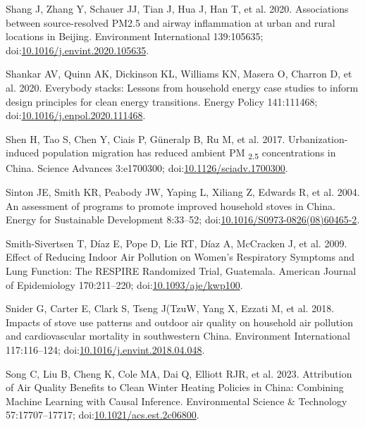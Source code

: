 \documentclass[
  letterpaper,
  DIV=11,
  numbers=noendperiod]{scrartcl}
\newlength{\cslhangindent}
\newenvironment{CSLReferences}[2] %
 {\begin{list}{}{%
  \setlength{\itemindent}{0pt}
  \setlength{\leftmargin}{0pt}
  \setlength{\parsep}{0pt}
  \ifodd #1
   \setlength{\leftmargin}{\cslhangindent}
   \setlength{\itemindent}{-1\cslhangindent}
  \fi
  \setlength{\itemsep}{#2\baselineskip}}}
 {\end{list}}
\providecommand{\DIFaddend}{} %
\DeclareRobustCommand{\DIFaddend}{\DIFOaddend \let\includegraphics\DIFOincludegraphics} %
\begin{document}
\begin{CSLReferences}{1}{1}
\DIFaddend {}
Shang J, Zhang Y, Schauer JJ, Tian J, Hua J, Han T, et al. 2020.
Associations between source-resolved {PM2}.5 and airway inflammation at
urban and rural locations in {Beijing}. Environment International
139:105635;
doi:\href{https://doi.org/10.1016/j.envint.2020.105635}{10.1016/j.envint.2020.105635}.

Shankar AV, Quinn AK, Dickinson KL, Williams KN, Masera O, Charron D, et
al. 2020. Everybody stacks: {Lessons} from household energy case studies
to inform design principles for clean energy transitions. Energy Policy
141:111468;
doi:\href{https://doi.org/10.1016/j.enpol.2020.111468}{10.1016/j.enpol.2020.111468}.

Shen H, Tao S, Chen Y, Ciais P, Güneralp B, Ru M, et al. 2017.
Urbanization-induced population migration has reduced ambient {PM}
{\textsubscript{2.5}} concentrations in {China}. Science Advances
3:e1700300;
doi:\href{https://doi.org/10.1126/sciadv.1700300}{10.1126/sciadv.1700300}.

Sinton JE, Smith KR, Peabody JW, Yaping L, Xiliang Z, Edwards R, et al.
2004. An assessment of programs to promote improved household stoves in
{China}. Energy for Sustainable Development 8:33--52;
doi:\href{https://doi.org/10.1016/S0973-0826(08)60465-2}{10.1016/S0973-0826(08)60465-2}.

Smith-Sivertsen T, Díaz E, Pope D, Lie RT, Díaz A, McCracken J, et al.
2009. Effect of {Reducing Indoor Air Pollution} on {Women}'s
{Respiratory Symptoms} and {Lung Function}: {The RESPIRE Randomized
Trial}, {Guatemala}. American Journal of Epidemiology 170:211--220;
doi:\href{https://doi.org/10.1093/aje/kwp100}{10.1093/aje/kwp100}.

Snider G, Carter E, Clark S, Tseng J(TzuW, Yang X, Ezzati M, et al.
2018. Impacts of stove use patterns and outdoor air quality on household
air pollution and cardiovascular mortality in southwestern {China}.
Environment International 117:116--124;
doi:\href{https://doi.org/10.1016/j.envint.2018.04.048}{10.1016/j.envint.2018.04.048}.

Song C, Liu B, Cheng K, Cole MA, Dai Q, Elliott RJR, et al. 2023.
Attribution of {Air Quality Benefits} to {Clean Winter Heating Policies}
in {China}: {Combining Machine Learning} with {Causal Inference}.
Environmental Science \& Technology 57:17707--17717;
doi:\href{https://doi.org/10.1021/acs.est.2c06800}{10.1021/acs.est.2c06800}.


\end{CSLReferences}
\end{document}

